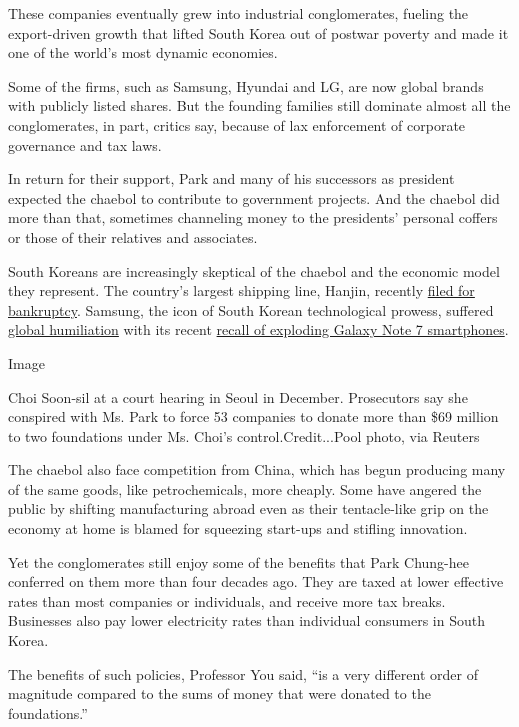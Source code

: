 These companies eventually grew into industrial conglomerates, fueling
the export-driven growth that lifted South Korea out of postwar poverty
and made it one of the world's most dynamic economies.

Some of the firms, such as Samsung, Hyundai and LG, are now global
brands with publicly listed shares. But the founding families still
dominate almost all the conglomerates, in part, critics say, because of
lax enforcement of corporate governance and tax laws.

In return for their support, Park and many of his successors as
president expected the chaebol to contribute to government projects. And
the chaebol did more than that, sometimes channeling money to the
presidents' personal coffers or those of their relatives and associates.

South Koreans are increasingly skeptical of the chaebol and the economic
model they represent. The country's largest shipping line, Hanjin,
recently
\href{http://www.nytimes.com/2016/09/16/business/dealbook/lack-of-planning-hampers-hanjin-shipping-bankruptcy.html}{filed
for bankruptcy}. Samsung, the icon of South Korean technological
prowess, suffered
\href{http://www.nytimes.com/2016/10/23/world/asia/galaxy-note-7-recall-south-korea-samsung.html}{global
humiliation} with its recent
\href{http://www.nytimes.com/2016/09/03/business/samsung-galaxy-note-battery.html}{recall
of exploding Galaxy Note 7 smartphones}.

Image

Choi Soon-sil at a court hearing in Seoul in December. Prosecutors say
she conspired with Ms. Park to force 53 companies to donate more than
\$69 million to two foundations under Ms. Choi's control.Credit...Pool
photo, via Reuters

The chaebol also face competition from China, which has begun producing
many of the same goods, like petrochemicals, more cheaply. Some have
angered the public by shifting manufacturing abroad even as their
tentacle-like grip on the economy at home is blamed for squeezing
start-ups and stifling innovation.

Yet the conglomerates still enjoy some of the benefits that Park
Chung-hee conferred on them more than four decades ago. They are taxed
at lower effective rates than most companies or individuals, and receive
more tax breaks. Businesses also pay lower electricity rates than
individual consumers in South Korea.

The benefits of such policies, Professor You said, ``is a very different
order of magnitude compared to the sums of money that were donated to
the foundations.''

